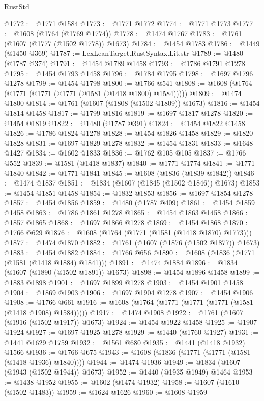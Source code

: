 \begin{lexlean}{RustStd}
\begin{coremodule}
@1772 := @1771 @1584
@1773 := @1771 @1772
@1774 := @1771 @1773
@1777 := @1608 (@1764 (@1769 @1774))
@1778 := @1474 @1767
@1783 := @1761 (@1607 (@1777 (@1502 @1778)) @1673)
@1784 := @1454 @1783
@1786 := @1449 (@1450 @369)
@1787 := LexLeanTarget.RustSyntax.Lit.str
@1789 := @1480 (@1787 @374)
@1791 := @1454 @1789 @1458
@1793 := @1786 @1791 @1278
@1795 := @1454 @1793 @1458
@1796 := @1784 @1795
@1798 := @1697 @1796 @1278
@1799 := @1454 @1798
@1800 := @1766 @541
@1808 := @1608 (@1764 (@1771 (@1771 (@1771 (@1581 (@1418 @1800) @1584)))))
@1809 := @1474 @1800
@1814 := @1761 (@1607 (@1808 (@1502 @1809)) @1673)
@1816 := @1454 @1814 @1458
@1817 := @1799 @1816
@1819 := @1697 @1817 @1278
@1820 := @1454 @1819
@1822 := @1480 (@1787 @391)
@1824 := @1454 @1822 @1458
@1826 := @1786 @1824 @1278
@1828 := @1454 @1826 @1458
@1829 := @1820 @1828
@1831 := @1697 @1829 @1278
@1832 := @1454 @1831
@1833 := @1648 @1427
@1834 := @1602 @1833
@1836 := @1762 @105 @105
@1837 := @1766 @552
@1839 := @1581 (@1418 @1837)
@1840 := @1771 @1774
@1841 := @1771 @1840
@1842 := @1771 @1841
@1845 := @1608 (@1836 (@1839 @1842))
@1846 := @1474 @1837
@1851 := @1834 (@1607 (@1845 (@1502 @1846)) @1673)
@1853 := @1454 @1851 @1458
@1854 := @1832 @1853
@1856 := @1697 @1854 @1278
@1857 := @1454 @1856
@1859 := @1480 (@1787 @409)
@1861 := @1454 @1859 @1458
@1863 := @1786 @1861 @1278
@1865 := @1454 @1863 @1458
@1866 := @1857 @1865
@1868 := @1697 @1866 @1278
@1869 := @1454 @1868
@1870 := @1766 @629
@1876 := @1608 (@1764 (@1771 (@1581 (@1418 @1870) @1773)))
@1877 := @1474 @1870
@1882 := @1761 (@1607 (@1876 (@1502 @1877)) @1673)
@1883 := @1454 @1882
@1884 := @1766 @656
@1890 := @1608 (@1836 (@1771 (@1581 (@1418 @1884) @1841)))
@1891 := @1474 @1884
@1896 := @1834 (@1607 (@1890 (@1502 @1891)) @1673)
@1898 := @1454 @1896 @1458
@1899 := @1883 @1898
@1901 := @1697 @1899 @1278
@1903 := @1454 @1901 @1458
@1904 := @1869 @1903
@1906 := @1697 @1904 @1278
@1907 := @1454 @1906
@1908 := @1766 @661
@1916 := @1608 (@1764 (@1771 (@1771 (@1771 (@1581 (@1418 @1908) @1584)))))
@1917 := @1474 @1908
@1922 := @1761 (@1607 (@1916 (@1502 @1917)) @1673)
@1924 := @1454 @1922 @1458
@1925 := @1907 @1924
@1927 := @1697 @1925 @1278
@1929 := @1440 (@1760 @1927)
@1931 := @1441 @1629 @1759
@1932 := @1561 @680
@1935 := @1441 (@1418 @1932) @1566
@1936 := @1766 @675
@1943 := @1608 (@1836 (@1771 (@1771 (@1581 (@1418 @1936) @1840))))
@1944 := @1474 @1936
@1949 := @1834 (@1607 (@1943 (@1502 @1944)) @1673)
@1952 := @1440 (@1935 @1949) @1464
@1953 := @1438 @1952
@1955 := @1602 (@1474 @1932)
@1958 := @1607 (@1610 (@1502 @1483))
@1959 := @1624 @1626
@1960 := @1608 @1959

\end{coremodule}
\end{lexlean}
